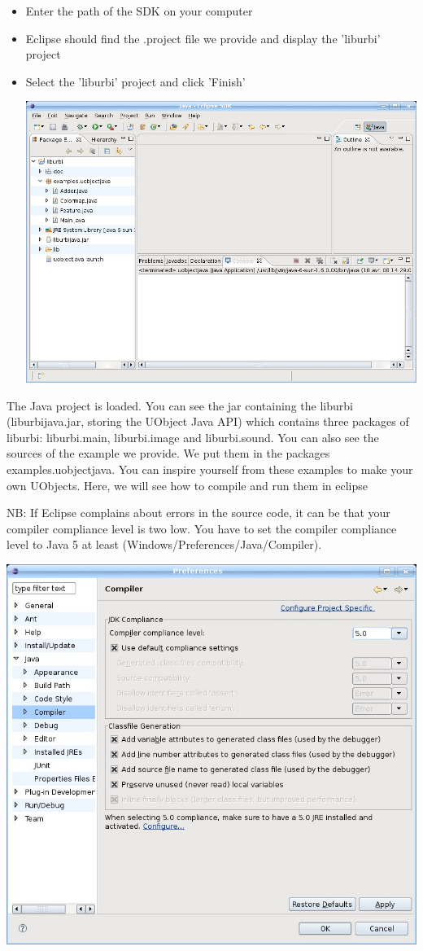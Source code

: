 \begin{itemize}
\item Enter the path of the \urbi SDK on your computer
\item Eclipse should find the .project file we provide and display the 'liburbi' project
\item Select the 'liburbi' project and click 'Finish'

\begin{center}
  \includegraphics[width=0.6\linewidth]{img/project-uobject-open}
\end{center}

\end{itemize}

The Java project is loaded. You can see the jar containing the liburbi
(liburbijava.jar, storing the UObject Java API) which contains three
packages of liburbi: liburbi.main, liburbi.image and liburbi.sound.  You can
also see the sources of the example we provide. We put them in the packages
examples.uobjectjava.  You can inspire yourself from these examples to make
your own UObjects.  Here, we will see how to compile and run them in eclipse

NB: If Eclipse complains about errors in the source code, it can be that
your compiler compliance level is two low. You have to set the compiler
compliance level to Java 5 at least (Windows/Preferences/Java/Compiler).

\begin{center}
  \includegraphics[width=0.6\linewidth]{img/compiler-compliance-level}
\end{center}


